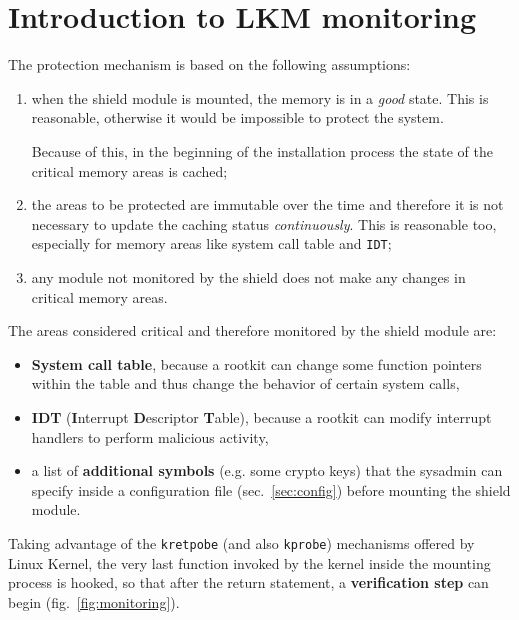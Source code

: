 \documentclass{article}
\begin{document}
	\section{Introduction to LKM monitoring}
	The protection mechanism is based on the following assumptions:
	\begin{enumerate}
		\item when the shield module is mounted, the memory is in a \textit{good} state. This is reasonable, otherwise
		it would be impossible to protect the system.

		Because of this, in the beginning of the installation process the state of the critical memory areas is cached;

		\item the areas to be protected are immutable over the time and therefore it is not necessary to update the
		caching status \textit{continuously}. This is reasonable too, especially for memory areas like system call table and \texttt{IDT};

		\item any module not monitored by the shield does not make any changes in critical memory areas.
	\end{enumerate}


	The areas considered critical and therefore monitored by the shield module are:
	\begin{itemize}
		\item \textbf{System call table}, because a rootkit can change some function pointers within the table and thus
		change the behavior of certain system calls,
		\item \textbf{IDT} (\textbf{I}nterrupt \textbf{D}escriptor \textbf{T}able), because a rootkit can modify
		interrupt handlers to perform malicious activity,
		\item a list of \textbf{additional symbols} (e.g. some crypto keys) that the sysadmin can specify inside a
		configuration file (sec.~\ref{sec:config}) before mounting the shield module.
	\end{itemize}

	Taking advantage of the \texttt{kretpobe} (and also \texttt{kprobe}) mechanisms offered by Linux
	Kernel, the very last function invoked by the kernel inside the mounting process is hooked, so
	that after the return statement, a \textbf{verification step} can begin (fig.~\ref{fig:monitoring}).
\end{document}
